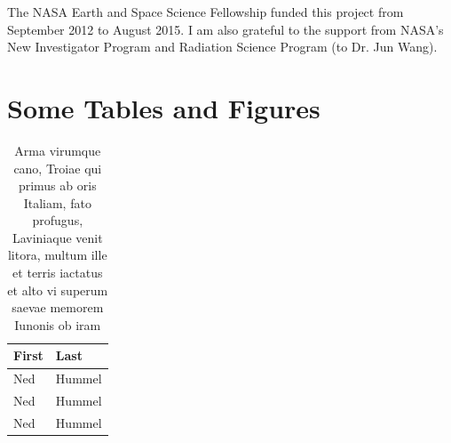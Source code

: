 \documentclass[phd, print]{nuthesis}
\begin{document}
\begin{grantinfo}
  The NASA Earth and Space Science Fellowship funded this project from September 
  2012 to August 2015. I am also grateful to the support from NASA's New Investigator 
  Program and Radiation Science Program (to Dr. Jun Wang).
\end{grantinfo}

\tableofcontents
\listoffigures
\listoftables

\mainmatter






\chapter{Some Tables and Figures}

\begin{table}[h]
  \centering
  \begin{tabular}{ll}\toprule
    First & Last \\ \midrule
    Ned & Hummel \\
    Ned & Hummel \\
    Ned & Hummel \\ \bottomrule
  \end{tabular}
  \caption{Arma virumque cano, Troiae qui primus ab oris Italiam, fato profugus,
Laviniaque venit litora, multum ille et terris iactatus et alto vi
superum saevae memorem Iunonis ob iram}
  \label{tab:tabular}
\end{table}
\end{document}
